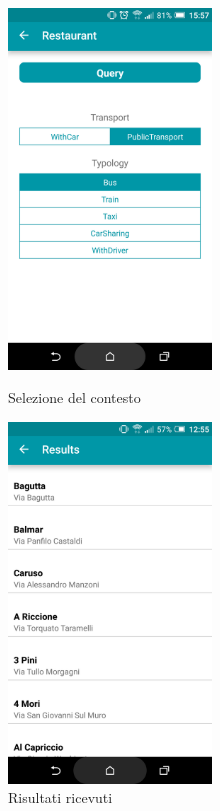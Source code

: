 \begin{figure}[ht]
	\begin{minipage}{0.5\textwidth}
		\centering
		\includegraphics[width=0.48\textwidth]{4-progettazione-alto-livello/Immagini/contesto_caso_d'uso.png}
		\caption{Selezione del contesto}\label{fig:usecase-contesto}
	\end{minipage}
	\begin{minipage}{0.5\textwidth}
		\centering
		\includegraphics[width=0.48\textwidth]{4-progettazione-alto-livello/Immagini/results_caso_d'uso.png}
		\caption{Risultati ricevuti}\label{fig:usecase-results}
	\end{minipage}
\end{figure}

